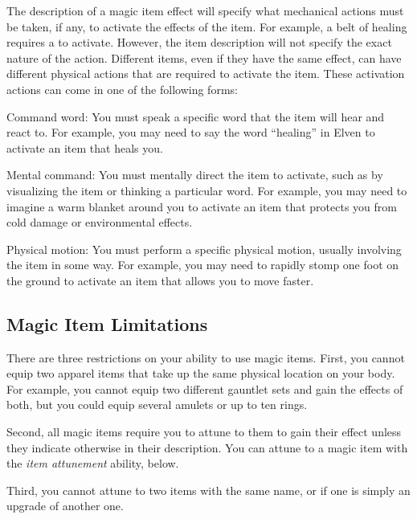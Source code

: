     The description of a magic item effect will specify what mechanical actions must be taken, if any, to activate the effects of the item.
    For example, a belt of healing requires a  to activate.
    However, the item description will not specify the exact nature of the action.
    Different items, even if they have the same effect, can have different physical actions that are required to activate the item.
    These activation actions can come in one of the following forms:
    \begin{raggeditemize}
      \item Command word: You must speak a specific word that the item will hear and react to.
        For example, you may need to say the word ``healing'' in Elven to activate an item that heals you.
      \item Mental command: You must mentally direct the item to activate, such as by visualizing the item or thinking a particular word.
        For example, you may need to imagine a warm blanket around you to activate an item that protects you from cold damage or environmental effects.
      \item Physical motion: You must perform a specific physical motion, usually involving the item in some way.
        For example, you may need to rapidly stomp one foot on the ground to activate an item that allows you to move faster.
    \end{raggeditemize}


  \subsection{Magic Item Limitations}

    There are three restrictions on your ability to use magic items.
    First, you cannot equip two apparel items that take up the same physical location on your body.
    For example, you cannot equip two different gauntlet sets and gain the effects of both, but you could equip several amulets or up to ten rings.

    Second, all magic items require you to attune to them to gain their effect unless they indicate otherwise in their description.
    You can attune to a magic item with the \textit{item attunement} ability, below.

    Third, you cannot attune to two items with the same name, or if one is simply an upgrade of another one.

